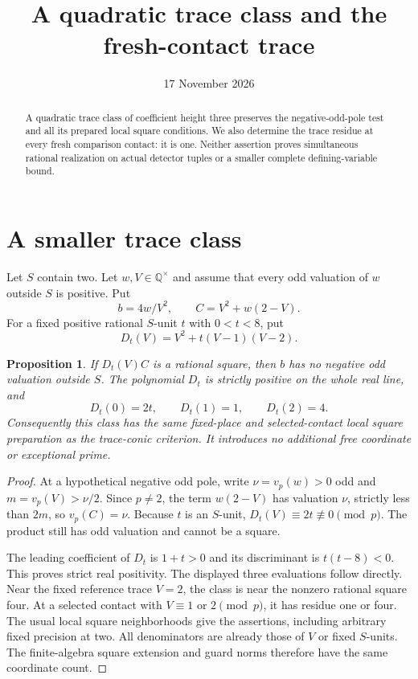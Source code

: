 \documentclass[11pt,a4paper]{article}
\title{A quadratic trace class and the fresh-contact trace}
\author{}\date{17 November 2026}
\newtheorem{proposition}{Proposition}[section]
\newcommand{\Q}{\mathbb Q}
\begin{document}
\maketitle
\begin{abstract}
A quadratic trace class of coefficient height three preserves the
negative-odd-pole test and all its prepared local square conditions.
We also determine the trace residue at every fresh comparison contact:
it is one. Neither assertion proves simultaneous rational realization
on actual detector tuples or a smaller complete defining-variable bound.
\end{abstract}

\section{A smaller trace class}
Let $S$ contain two. Let $w,V\in\Q^\times$ and assume that every
odd valuation of $w$ outside $S$ is positive. Put
\[
 b=4w/V^2,\qquad C=V^2+w(2-V).
\]
For a fixed positive rational $S$-unit $t$ with $0<t<8$, put
\[
 D_t(V)=V^2+t(V-1)(V-2).
\]
\begin{proposition}
If $D_t(V)C$ is a rational square, then $b$ has no negative odd
valuation outside $S$. The polynomial $D_t$ is strictly positive on
the whole real line, and
\[
 D_t(0)=2t,\qquad D_t(1)=1,\qquad D_t(2)=4.
\]
Consequently this class has the same fixed-place and selected-contact
local square preparation as the trace-conic criterion. It introduces
no additional free coordinate or exceptional prime.
\end{proposition}
\begin{proof}
At a hypothetical negative odd pole, write $\nu=v_p(w)>0$ odd and
$m=v_p(V)>\nu/2$. Since $p\ne2$, the term $w(2-V)$ has
valuation $\nu$, strictly less than $2m$, so $v_p(C)=\nu$.
Because $t$ is an $S$-unit, $D_t(V)\equiv2t\not\equiv0\pmod p$.
The product still has odd valuation and cannot be a square.

The leading coefficient of $D_t$ is $1+t>0$ and its discriminant
is $t(t-8)<0$. This proves strict real positivity. The displayed
three evaluations follow directly. Near the fixed reference trace
$V=2$, the class is near the nonzero rational square four. At a
selected contact with $V\equiv1$ or $2\pmod p$, it has residue
one or four. The usual local square neighborhoods give the assertions,
including arbitrary fixed precision at two. All denominators are
already those of $V$ or fixed $S$-units. The finite-algebra square
extension and guard norms therefore have the same coordinate count.
\end{proof}
\end{document}

